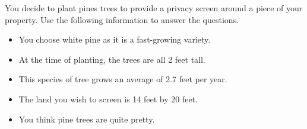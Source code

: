\documentclass{ximera}
\begin{document}
\begin{problem}
    You decide to plant pines trees to provide a privacy screen around a piece of your property. Use the following information to answer the questions.
    \begin{itemize}
        \item You choose white pine as it is a fast-growing variety.
        \item At the time of planting, the trees are all 2 feet tall.
        \item This species of tree grows an average of 2.7 feet per year.
        \item The land you wish to screen is 14 feet by 20 feet.
        \item You think pine trees are quite pretty.
    \end{itemize}
%


\end{problem}
\end{document}
